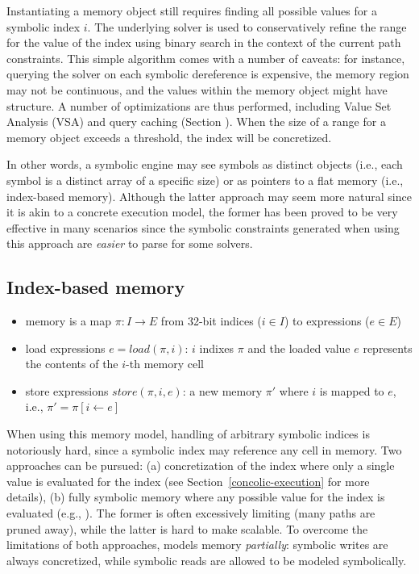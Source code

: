 Instantiating a memory object still requires finding all possible values for a symbolic index $i$. The underlying solver is used to conservatively refine the range for the value of the index using binary search in the context of the current path constraints. This simple algorithm comes with a number of caveats: for instance, querying the solver on each symbolic dereference is expensive, the memory region may not be continuous, and the values within the memory object might have structure. A number of optimizations are thus performed, including Value Set Analysis (VSA) and query caching (Section \missing). When the size of a range for a memory object exceeds a threshold, the index will be concretized.

\iffalse
\vspace{2em}In other words, a symbolic engine may see symbols as distinct objects (i.e., each symbol is a distinct array of a specific size) or as pointers to a flat memory (i.e., index-based memory). Although the latter approach may seem more natural since it is akin to a concrete execution model, the former has been proved to be very effective in many scenarios since the symbolic constraints generated when using this approach are {\em easier} to parse for some solvers.

\subsection{Index-based memory}

\begin{itemize}
  \item memory is a map $\pi : I \to E$ from 32-bit indices ($i \in I$) to expressions ($e \in E$)
  \item load expressions $e = load(\pi, i)$: $i$ indixes $\pi$ and the loaded value $e$ represents the contents of the $i$-th memory cell
  \item store expressions $store(\pi, i, e)$: a new memory $\pi'$ where $i$ is mapped to $e$, i.e., $\pi' = \pi[i \gets e]$
\end{itemize}
When using this memory model, handling of arbitrary symbolic indices is notoriously hard, since a symbolic index may reference any cell in memory. Two approaches can be pursued: (a) concretization of the index where only a single value is evaluated for the index (see Section~\ref{concolic-execution} for more details), (b) fully symbolic memory where any possible value for the index is evaluated (e.g., \cite{BAP-CAV11}). The former is often excessively limiting (many paths are pruned away), while the latter is hard to make scalable. To overcome the limitations of both approaches, \cite{MAYHEM-SP12} models memory {\em partially}: symbolic writes are always concretized, while symbolic reads are allowed to be modeled symbolically.

